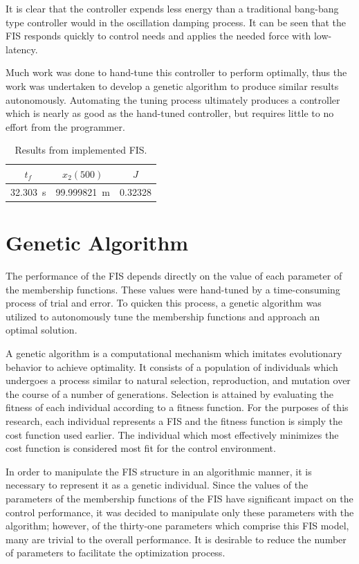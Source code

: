 It is clear that the controller expends less energy than a traditional bang-bang type controller would in the
oscillation damping process. It can be seen that the FIS responds quickly to control needs and applies the
needed force with low-latency. 

Much work was done to hand-tune this controller to perform optimally, thus the work was undertaken to develop
a genetic algorithm to produce similar results autonomously. Automating the tuning process ultimately produces
a controller which is nearly as good as the hand-tuned controller, but requires little to no effort from the
programmer.

\begin{table} \centering \caption{Results from implemented FIS.} \label{tab:finalres} \begin{tabular}{|c|c|c|}
\hline $t_f$ & $x_2(500)$ & $J$ \\ \hline \SI{32.303}{\second} & \SI{99.999821}{\metre} & 0.32328 \\ \hline
\end{tabular} \end{table}

\section{Genetic Algorithm}\label{s:ga} The performance of the FIS depends directly
on the value of each parameter of the membership functions. These values were hand-tuned by a time-consuming
process of trial and error. To quicken this process, a genetic algorithm was utilized to autonomously tune the
membership functions and approach an optimal solution. 

      A genetic algorithm is a computational mechanism which imitates evolutionary behavior to achieve
      optimality. It consists of a population of individuals which undergoes a process similar to natural
      selection, reproduction, and mutation over the course of a number of generations\cite{cordon:01bk}.
      Selection is attained by evaluating the fitness of each individual according to a fitness function. For
      the purposes of this research, each individual represents a FIS and the fitness function is simply the
      cost function used earlier. The individual which most effectively minimizes the cost function is
      considered most fit for the control environment.
      
      In order to manipulate the FIS structure in an algorithmic manner, it is necessary to represent it as a
      genetic individual. Since the values of the parameters of the membership functions of the FIS have
      significant impact on the control performance, it was decided to manipulate only these parameters with
      the algorithm; however, of the thirty-one parameters which comprise this FIS model, many are trivial to
      the overall performance. It is desirable to reduce the number of parameters to facilitate the
      optimization process.


